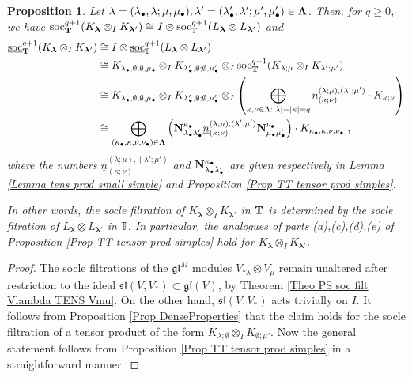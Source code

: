 \documentclass[12pt]{article}
\def\TT {{\mathbb T}}     %
\def\mk {\mathfrak}
\def\ul  {\underline}
\newtheorem{prop}[theorem]{Proposition}
\begin{document}
\begin{prop}\label{Prop IT tensor prod simples}
Let $\bf\lambda=(\lambda_\bullet,\lambda;\mu,\mu_\bullet),\bf\lambda'=(\lambda'_\bullet,\lambda';\mu',\mu'_\bullet)\in\bm\Lambda$. Then, for $q\geq 0$, we have ${\rm soc}_{\bf T}^{q+1}(K_{\bm\lambda}\otimes_I K_{\bm\lambda'}) \cong I\otimes {\rm soc}_{\TT}^{q+1}(L_{\bm\lambda}\otimes L_{\bm\lambda'})$ and
\begin{align*}
\ul{\rm soc}_{\bf T}^{q+1}(K_{\bm\lambda}\otimes_I K_{\bm\lambda'}) & \cong I\otimes \ul{\rm soc}_{\TT}^{q+1}(L_{\bm\lambda}\otimes L_{\bm\lambda'})\\ & \cong K_{\lambda_\bullet,\emptyset;\emptyset,\mu_\bullet}\otimes_I K_{\lambda'_\bullet,\emptyset;\emptyset,\mu'_\bullet} \otimes_I \ul{\rm soc}_{\bf T}^{q+1}(K_{\lambda;\mu}\otimes_I K_{\lambda';\mu'}) \\
& \cong K_{\lambda_\bullet,\emptyset;\emptyset,\mu_\bullet}\otimes_I K_{\lambda'_\bullet,\emptyset;\emptyset,\mu'_\bullet} \otimes_I \left(\bigoplus\limits_{\kappa,\nu\in\Lambda:|\lambda|-|\kappa|=q} \ul{n}^{(\lambda;\mu),(\lambda';\mu')}_{(\kappa;\nu)} \cdot K_{\kappa;\nu} \right) \\
& \cong \bigoplus\limits_{(\kappa_\bullet,\kappa,\nu,\nu_\bullet)\in\bm\Lambda} \left({\bf N}^{\kappa_\bullet}_{\lambda_\bullet\lambda'_\bullet} \ul{n}^{(\lambda;\mu),(\lambda';\mu')}_{(\kappa;\nu)} {\bf N}^{\nu_\bullet}_{\mu_\bullet\mu'_\bullet}\right) \cdot K_{\kappa_\bullet,\kappa;\nu,\nu_\bullet}  \;,
\end{align*}
where the numbers $\ul{n}^{(\lambda;\mu),(\lambda';\mu')}_{(\kappa;\nu)}$ and ${\bf N}^{\kappa_\bullet}_{\lambda_\bullet\lambda'_\bullet}$ are given respectively in Lemma \ref{Lemma tens prod small simple} and Proposition \ref{Prop TT tensor prod simples}.

In other words, the socle filtration of $K_{\bm\lambda} \otimes_I K_{\bm\lambda'}$ in ${\bf T}$ is determined by the socle fitration of $L_{\bm\lambda} \otimes L_{\bm\lambda'}$ in $\TT$. In particular, the analogues of parts (a),(c),(d),(e) of Proposition \ref{Prop TT tensor prod simples} hold for $K_{\bm\lambda} \otimes_I K_{\bm\lambda'}$.
\end{prop}

\begin{proof}
The socle filtrations of the $\mk{gl}^M$ modules $V_{*\lambda}\otimes V_\mu$ remain unaltered after restriction to the ideal $\mk{sl}(V,V_*)\subset\mk{gl}(V)$, by Theorem \ref{Theo PS soc filt Vlambda TENS Vmu}. On the other hand, $\mk{sl}(V,V_*)$ acts trivially on $I$. It follows from Proposition \ref{Prop DenseProperties} that the claim holds for the socle filtration of a tensor product of the form $K_{\lambda;\emptyset}\otimes_I K_{\emptyset;\mu'}$. Now the general statement follows from Proposition \ref{Prop TT tensor prod simples} in a straightforward manner.
\end{proof}
\end{document}
